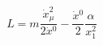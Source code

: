 \begin{equation}
L=m\frac{\dot{x}_\mu^2}{2\dot{x}{}^0}
-\frac{\dot{x}{}^0}{2}\frac{\alpha}{x_1^2}
\label{repar2}
\end{equation}

